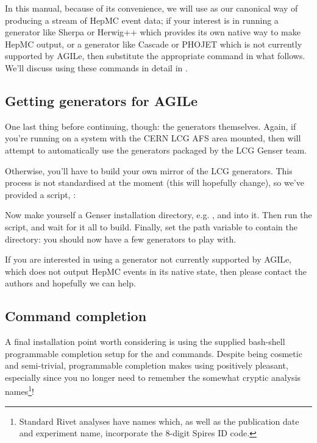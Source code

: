 \documentclass{JHEP3}
\begin{document}
In this manual, because of its convenience, we will use  as our
canonical way of producing a stream of HepMC event data; if your interest is in
running a generator like Sherpa or Herwig++ which provides its own native way to
make HepMC output, or a generator like Cascade or PHOJET which is not currently
supported by AGILe, then substitute the appropriate command in what follows.
We'll discuss using these commands in detail in .


\subsection{Getting generators for AGILe}
\label{sec:genser}

One last thing before continuing, though: the generators themselves. Again, if
you're running on a system with the CERN LCG AFS area mounted, then
 will attempt to automatically use the generators packaged by the
LCG Genser team.

Otherwise, you'll have to build your own mirror of the LCG generators. This
process is not standardised at the moment (this will hopefully
change), so we've provided a script, :\\

Now make yourself a Genser installation directory, e.g. ,
and  into it. Then run the  script, and wait
for it all to build. Finally, set the  path variable to
contain the  directory: you should now have a few
generators to play with.

If you are interested in using a generator not currently supported by AGILe,
which does not output HepMC events in its native state, then please contact the
authors and hopefully we can help.


\subsection{Command completion}

A final installation point worth considering is using the supplied bash-shell
programmable completion setup for the  and 
commands. Despite being cosmetic and semi-trivial, programmable completion makes
using  positively pleasant, especially since you no longer need to
remember the somewhat cryptic analysis names\footnote{Standard Rivet analyses
  have names which, as well as the publication date and experiment name,
  incorporate the 8-digit Spires ID code.}!
\end{document}
